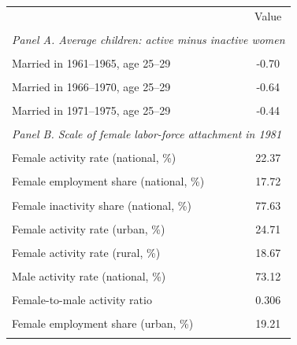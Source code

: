 \begin{tabular}{lc} \hline
 & Value \\\\
\hline
\multicolumn{2}{l}{\textit{Panel A. Average children: active minus inactive women}} \\\\
Married in 1961--1965, age 25--29 & -0.70 \\\\
Married in 1966--1970, age 25--29 & -0.64 \\\\
Married in 1971--1975, age 25--29 & -0.44 \\\\
\multicolumn{2}{l}{\textit{Panel B. Scale of female labor-force attachment in 1981}} \\\\
Female activity rate (national, \%) & 22.37 \\\\
Female employment share (national, \%) & 17.72 \\\\
Female inactivity share (national, \%) & 77.63 \\\\
Female activity rate (urban, \%) & 24.71 \\\\
Female activity rate (rural, \%) & 18.67 \\\\
Male activity rate (national, \%) & 73.12 \\\\
Female-to-male activity ratio & 0.306 \\\\
Female employment share (urban, \%) & 19.21 \\\\
\hline
\end{tabular}
